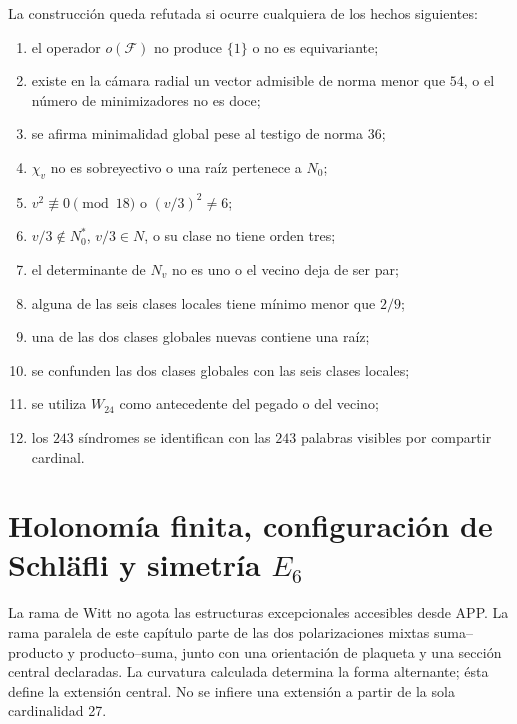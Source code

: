 \begin{criterion}
La construcción queda refutada si ocurre cualquiera de los hechos
siguientes:
\begin{enumerate}
 \item el operador \(o(\mathcal F)\) no produce \(\{1\}\) o no es
       equivariante;
 \item existe en la cámara radial un vector admisible de norma menor que
       \(54\), o el número de minimizadores no es doce;
 \item se afirma minimalidad global pese al testigo de norma \(36\);
 \item \(\chi_v\) no es sobreyectivo o una raíz pertenece a \(N_0\);
 \item \(v^2\not\equiv0\pmod{18}\) o \((v/3)^2\neq6\);
 \item \(v/3\notin N_0^*\), \(v/3\in N\), o su clase no tiene orden tres;
 \item el determinante de \(N_v\) no es uno o el vecino deja de ser par;
 \item alguna de las seis clases locales tiene mínimo menor que \(2/9\);
 \item una de las dos clases globales nuevas contiene una raíz;
 \item se confunden las dos clases globales con las seis clases locales;
 \item se utiliza \(W_{24}\) como antecedente del pegado o del vecino;
 \item los \(243\) síndromes se identifican con las \(243\) palabras
       visibles por compartir cardinal.
\end{enumerate}
\end{criterion}


\section{Holonomía finita, configuración de Schläfli y simetría \texorpdfstring{\(E_6\)}{E6}}
\label{p12-83-c20-s6:chap:holonomia-schlafli-e6-nuevo}

La rama de Witt no agota las estructuras excepcionales accesibles desde
APP. La rama paralela de este capítulo parte de las dos polarizaciones
mixtas suma--producto y producto--suma, junto con una orientación de
plaqueta y una sección central declaradas. La curvatura calculada determina
la forma alternante; ésta define la extensión central. No se infiere una
extensión a partir de la sola cardinalidad 27.

